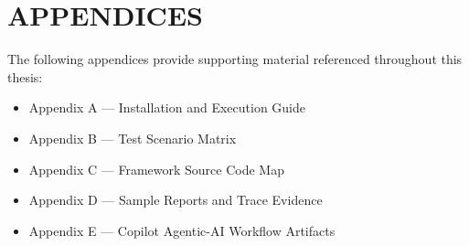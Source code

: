 \documentclass[12pt,a4paper,oneside]{report}
\begin{document}
\hypersetup{pageanchor=false}

\clearpage

\hypersetup{pageanchor=true}

\clearpage

\tableofcontents
\clearpage
{}
{}
\listoffigures
\clearpage
{}
{}
\listoftables
\clearpage


\clearpage

\clearpage

\clearpage

\clearpage

\clearpage









\clearpage
{}
\printbibliography[heading=thesisbib,title={References}]

\clearpage
{}
{}
\chapter*{APPENDICES}
\noindent The following appendices provide supporting material referenced throughout this thesis:
\begin{itemize}[leftmargin=2em,itemsep=0.2em]
  \item Appendix A --- Installation and Execution Guide
  \item Appendix B --- Test Scenario Matrix
  \item Appendix C --- Framework Source Code Map
  \item Appendix D --- Sample Reports and Trace Evidence
  \item Appendix E --- Copilot Agentic-AI Workflow Artifacts
\end{itemize}






\end{document}
